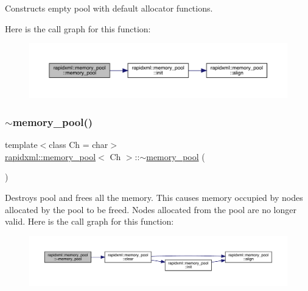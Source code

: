 Constructs empty pool with default allocator functions. 

Here is the call graph for this function\+:\nopagebreak
\begin{figure}[H]
\begin{center}
\leavevmode
\includegraphics[width=350pt]{classrapidxml_1_1memory__pool_a0b609da81dff28a19ebd704400788429_cgraph}
\end{center}
\end{figure}
\mbox{\label{classrapidxml_1_1memory__pool_a0a3e82126e59e4077f41e933130bb5a0}} 
\subsubsection{\texorpdfstring{$\sim$memory\_pool()}{~memory\_pool()}}
{\footnotesize\ttfamily template$<$class Ch  = char$>$ \\
\mbox{\hyperlink{classrapidxml_1_1memory__pool}{rapidxml\+::memory\+\_\+pool}}$<$ Ch $>$\+::$\sim$\mbox{\hyperlink{classrapidxml_1_1memory__pool}{memory\+\_\+pool}} (\begin{DoxyParamCaption}{ }\end{DoxyParamCaption})\hspace{0.3cm}{\ttfamily [inline]}}

Destroys pool and frees all the memory. This causes memory occupied by nodes allocated by the pool to be freed. Nodes allocated from the pool are no longer valid. Here is the call graph for this function\+:\nopagebreak
\begin{figure}[H]
\begin{center}
\leavevmode
\includegraphics[width=350pt]{classrapidxml_1_1memory__pool_a0a3e82126e59e4077f41e933130bb5a0_cgraph}
\end{center}
\end{figure}


